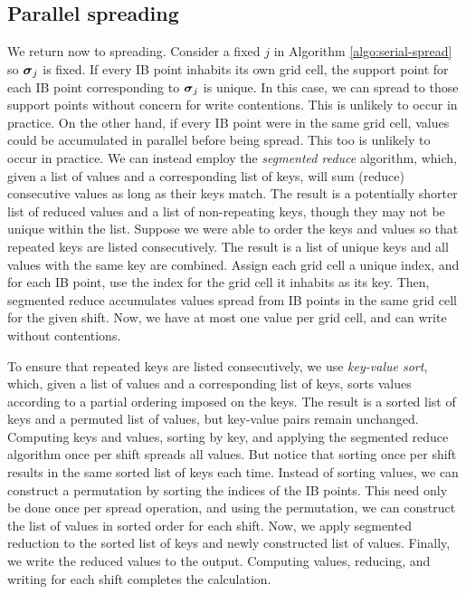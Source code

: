 \subsection{Parallel spreading}

We return now to spreading. Consider a fixed $j$ in Algorithm \ref{algo:serial-spread}
so $\boldsymbol{\sigma}_j$ is fixed. If every IB point inhabits its own grid cell, the support point
for each IB point corresponding to $\boldsymbol{\sigma}_j$ is unique. In this case, we can spread to
those support points without concern for write contentions. This is unlikely to occur in
practice. On the other hand, if every IB point were in the same grid cell, values could
be accumulated in parallel before being spread. This too is unlikely to occur in
practice. We can instead employ the \emph{segmented reduce} algorithm, which, given a
list of values and a corresponding list of keys, will sum (reduce) consecutive values as
long as their keys match. The result is a potentially shorter list of reduced values and
a list of non-repeating keys, though they may not be unique within the list. Suppose we
were able to order the keys and values so that repeated keys are listed consecutively.
The result is a list of unique keys and all values with the same key are combined. Assign
each grid cell a unique index, and for each IB point, use the index for the grid cell it
inhabits as its key. Then, segmented reduce accumulates values spread from IB points in
the same grid cell for the given shift. Now, we have at most one value per grid cell, and
can write without contentions.

To ensure that repeated keys are listed consecutively, we use \emph{key-value sort},
which, given a list of values and a corresponding list of keys, sorts values according to
a partial ordering imposed on the keys. The result is a sorted list of keys and a
permuted list of values, but key-value pairs remain unchanged. Computing keys and values,
sorting by key, and applying the segmented reduce algorithm once per shift spreads all
values.  But notice that sorting once per shift results in the same sorted list of keys
each time.  Instead of sorting values, we can construct a permutation by sorting the
indices of the IB points. This need only be done once per spread operation, and using the
permutation, we can construct the list of values in sorted order for each shift. Now, we
apply segmented reduction to the sorted list of keys and newly constructed list of
values.  Finally, we write the reduced values to the output. Computing values, reducing,
and writing for each shift completes the calculation.

